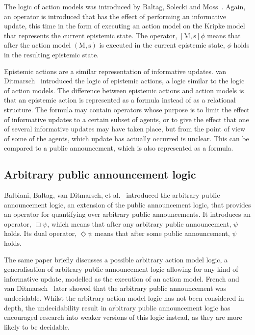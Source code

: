 The logic of action models was introduced by Baltag, Solecki and
Moss~\cite{baltag2004logics}. Again, an operator is introduced that has the
effect of performing an informative update, this time in the form of executing
an action model on the Kripke model that represents the current epistemic
state.  The operator, $[\mathrm{M,s}]\phi$ means that after the action model
$(\mathrm{M, s})$ is executed in the current epistemic state, $\phi$ holds in
the resulting epistemic state. 

Epistemic actions are a similar representation of informative updates.
van
Ditmarsch~\cite{vanditmarsch1999logic,vanditmarsch2001knowledge,vanditmarsch2007dynamic}
introduced the logic of epistemic actions, a logic similar to the logic of
action models. The difference between epistemic actions and action models is
that an epistemic action is represented as a formula instead of as a relational
structure. The formula may contain operators whose purpose is to limit the
effect of informative updates to a certain subset of agents, or to give the
effect that one of several informative updates may have taken place, but from
the point of view of some of the agents, which update has actually occurred is
unclear. This can be compared to a public announcement, which is also
represented as a formula.

\subsection{Arbitrary public announcement logic}

Balbiani, Baltag, van Ditmarsch, et al.~\cite{balbiani2007arbitrary} introduced
the arbitrary public announcement logic, an extension of the public announcement
logic, that provides an operator for quantifying over arbitrary public
announcements. It introduces an operator, $\Box\psi$, which means that after
any arbitrary public announcement, $\psi$ holds. Its dual operator,
$\Diamond\psi$ means that after some public announcement, $\psi$ holds.

The same paper briefly discusses a possible arbitrary action model logic, a
generalisation of arbitrary public announcement logic allowing for any kind of
informative update, modelled as the execution of an action model. French and
van Ditmarsch~\cite{french2008undecidability} later showed that the arbitrary
public announcement was undecidable. Whilst the arbitrary action model logic has
not been considered in depth, the undecidability result in arbitrary public
announcement logic has encouraged research into weaker versions of this logic
instead, as they are more likely to be decidable.

